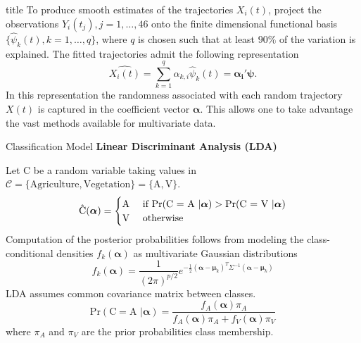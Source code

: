 \documentclass{beamer}
\begin{document}
\begin{frame}[t]{title}
	To produce smooth estimates of the trajectories $X_i(t)$, project the observations $Y_i(t_j), j = 1, \dots, 46$ onto the finite dimensional functional basis $\{\hat{\psi}_k(t), k = 1, \dots, q\}$, where $q$ is chosen such that at least $90\%$ of the variation is explained. The fitted trajectories admit the following representation
	\begin{equation}
		\widehat{X_i(t)} = \sum_{k=1}^q\alpha_{k,i} \hat{\psi}_k(t) = \boldsymbol{\alpha_i'}\boldsymbol{\psi}.
		\label{phen:coef}
	\end{equation}
	In this representation the randomness associated with each random trajectory $X(t)$ is captured in the coefficient vector $\boldsymbol{\alpha}$. This allows one to take advantage the vast methods available for multivariate data.
\end{frame}


\begin{frame}[t]{Classification Model}
	\textbf{Linear Discriminant Analysis (LDA)} %
	
	Let C be a random variable taking values in $\mathcal{C} = \{ \text{Agriculture}, \text{Vegetation}\} = \{\text{A}, \text{V}\}$. 
	\begin{equation*}
		\hat{\text{C}}(\boldsymbol{\alpha}) = 
		\begin{cases}
				\text{A} \hfill & \text{ if } \text{Pr}(\text{C = A }| \boldsymbol{\alpha})> \text{Pr}(\text{C = V }| \boldsymbol{\alpha})\\
				\text{V} \hfill & \text{ otherwise}
		\end{cases}
	\end{equation*}  
	Computation of the posterior probabilities follows from modeling the class-conditional densities $f_k(\boldsymbol\alpha)$ as multivariate Gaussian distributions
	\begin{equation*}
		f_k(\boldsymbol\alpha) = \frac{1}{(2\pi)^{p/2}}e^{-\frac{1}{2}(\boldsymbol\alpha - \boldsymbol\mu_k)^T\Sigma^{-1}(\boldsymbol\alpha - \boldsymbol\mu_k)}
	\end{equation*}
	LDA assumes common covariance matrix between classes. 
	\begin{equation*}
		\text{Pr}(\text{C} = \text{A } | \boldsymbol\alpha) = \frac{f_{A}(\boldsymbol\alpha)\pi_{A}}{f_{A}(\boldsymbol\alpha)\pi_{A}+f_{V}(\boldsymbol\alpha)\pi_{V}}
	\end{equation*}
	where $\pi_{A}$ and $\pi_{V}$ are the prior probabilities class membership.
\end{frame}
\end{document}
